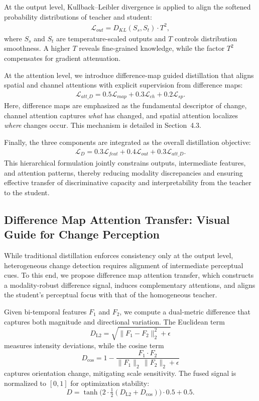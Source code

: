 \documentclass[a4paper,fleqn]{cas-dc}
\begin{document}
At the output level, Kullback--Leibler divergence is applied to align the softened probability distributions of teacher and student:
\begin{align}
\mathcal{L}_{out} = D_{KL}(S_s,S_t) \cdot T^2,
\end{align}
where $S_s$ and $S_t$ are temperature-scaled outputs and $T$ controls distribution smoothness. A higher $T$ reveals fine-grained knowledge, while the factor $T^2$ compensates for gradient attenuation.  

At the attention level, we introduce difference-map guided distillation that aligns spatial and channel attentions with explicit supervision from difference maps:
\begin{align}
\mathcal{L}_{att\_D} = 0.5 \mathcal{L}_{map} + 0.3 \mathcal{L}_{ch} + 0.2 \mathcal{L}_{sp}.
\end{align}
Here, difference maps are emphasized as the fundamental descriptor of change, channel attention captures \textit{what} has changed, and spatial attention localizes \textit{where} changes occur. This mechanism is detailed in Section~4.3.  

Finally, the three components are integrated as the overall distillation objective:
\begin{align}
\mathcal{L}_D = 0.3 \mathcal{L}_{feat} + 0.4 \mathcal{L}_{out} + 0.3 \mathcal{L}_{att\_D}.
\end{align}
This hierarchical formulation jointly constrains outputs, intermediate features, and attention patterns, thereby reducing modality discrepancies and ensuring effective transfer of discriminative capacity and interpretability from the teacher to the student.

\subsection{Difference Map Attention Transfer: Visual Guide for Change Perception}
While traditional distillation enforces consistency only at the output level, heterogeneous change detection requires alignment of intermediate perceptual cues. To this end, we propose difference map attention transfer, which constructs a modality-robust difference signal, induces complementary attentions, and aligns the student’s perceptual focus with that of the homogeneous teacher.

Given bi-temporal features $F_1$ and $F_2$, we compute a dual-metric difference that captures both magnitude and directional variation. The Euclidean term
\begin{equation}
D_{\mathrm{L2}}=\sqrt{\lVert F_1-F_2\rVert_2^2+\epsilon}
\end{equation}
measures intensity deviations, while the cosine term
\begin{equation}
D_{\mathrm{cos}}=1-\frac{F_1\!\cdot\! F_2}{\lVert F_1\rVert_2\,\lVert F_2\rVert_2+\epsilon}
\end{equation}
captures orientation change, mitigating scale sensitivity. The fused signal is normalized to $[0,1]$ for optimization stability:
\begin{equation}
D=\tanh\!\Big(2\cdot\tfrac{1}{2}(D_{\mathrm{L2}}+D_{\mathrm{cos}})\Big)\cdot 0.5+0.5.
\end{equation}
\end{document}
